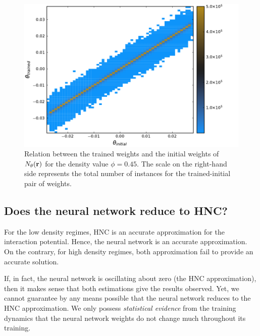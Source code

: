 \begin{figure}
    \includegraphics[width=\textwidth]{figuras/capitulo-3/weights_phi=0.45.pdf}
    \caption[Comparison between weights, $\phi=0.45$.]{Relation between the trained weights and the initial weights of $N_{\theta}(\mathbf{r})$ for the density value $\phi=0.45$. The scale on the right-hand side represents the total number of instances for the trained-initial pair of weights.}
    \label{fig:pesos45}
\end{figure}

\subsection{Does the neural network reduce to HNC?}
For the low density regimes, HNC is an accurate approximation for the interaction potential.
Hence, the neural network is an accurate approximation. On the contrary, for high density
regimes, both approximation fail to provide an accurate solution.

If, in fact, the neural network is oscillating about zero (the HNC approximation), then
it makes sense that both estimations give the results observed. Yet, we cannot guarantee
by any means possible that the neural network reduces to the HNC approximation.
We only possess \emph{statistical evidence} from the training dynamics that the neural
network weights do not change much throughout its training.

